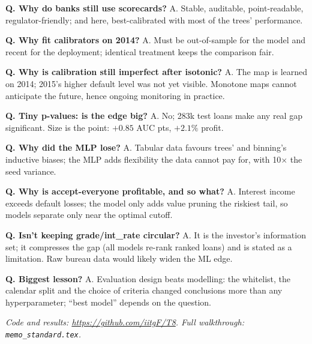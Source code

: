 \documentclass[a4paper,10pt]{article}
\begin{document}
\textbf{Q. Why do banks still use scorecards?} A. Stable, auditable, point-readable, regulator-friendly; and here, best-calibrated with most of the trees' performance.

\textbf{Q. Why fit calibrators on 2014?} A. Must be out-of-sample for the model and recent for the deployment; identical treatment keeps the comparison fair.

\textbf{Q. Why is calibration still imperfect after isotonic?} A. The map is learned on 2014; 2015's higher default level was not yet visible. Monotone maps cannot anticipate the future, hence ongoing monitoring in practice.

\textbf{Q. Tiny p-values: is the edge big?} A. No; 283k test loans make any real gap significant. Size is the point: $+0.85$ AUC pts, $+2.1\%$ profit.

\textbf{Q. Why did the MLP lose?} A. Tabular data favours trees' and binning's inductive biases; the MLP adds flexibility the data cannot pay for, with 10$\times$ the seed variance.

\textbf{Q. Why is accept-everyone profitable, and so what?} A. Interest income exceeds default losses; the model only adds value pruning the riskiest tail, so models separate only near the optimal cutoff.

\textbf{Q. Isn't keeping grade/int\_rate circular?} A. It is the investor's information set; it compresses the gap (all models re-rank ranked loans) and is stated as a limitation. Raw bureau data would likely widen the ML edge.

\textbf{Q. Biggest lesson?} A. Evaluation design beats modelling: the whitelist, the calendar split and the choice of criteria changed conclusions more than any hyperparameter; ``best model'' depends on the question.

\vspace{2mm}
\textit{Code and results: \url{https://github.com/iitgF/T8}. Full walkthrough: \texttt{memo\_standard.tex}.}
\end{document}
